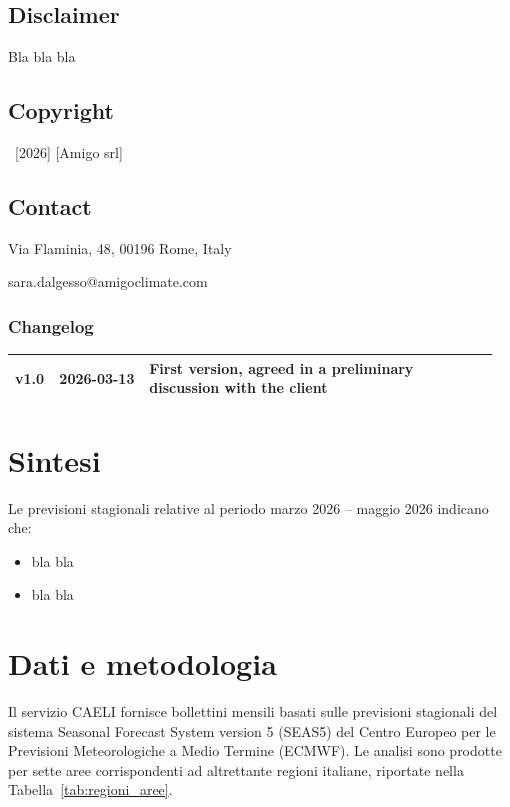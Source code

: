 \documentclass[
	a4paper, %
	12pt, %
]{CSSullivanBusinessReport}
\begin{document}
\subsection*{Disclaimer}
Bla bla bla

\subsection*{Copyright}
\textcopyright\ [2026] [Amigo srl]

\subsection*{Contact}
Via Flaminia, 48, 00196 Rome, Italy

sara.dalgesso@amigoclimate.com

\vfill

\subsubsection*{Changelog}
\scriptsize

\begin{tabular}{@{} p{0.08\linewidth} p{0.18\linewidth} p{0.70\linewidth} @{}}
\toprule
v1.0 & 2026-03-13 & First version, agreed in a preliminary discussion with the client \\
\bottomrule
\end{tabular}

\newpage


\normalsize

\section{Sintesi}
Le previsioni stagionali relative al periodo marzo 2026 -- maggio 2026 indicano che:
\begin{itemize}
  \item bla bla
  \item bla bla
\end{itemize}

\section{Dati e metodologia}
Il servizio CAELI fornisce bollettini mensili basati sulle previsioni stagionali del sistema Seasonal Forecast System version 5 (SEAS5) del Centro Europeo per le Previsioni Meteorologiche a Medio Termine (ECMWF). Le analisi sono prodotte per sette aree corrispondenti ad altrettante regioni italiane, riportate nella Tabella~\ref{tab:regioni_aree}. 
\end{document}
